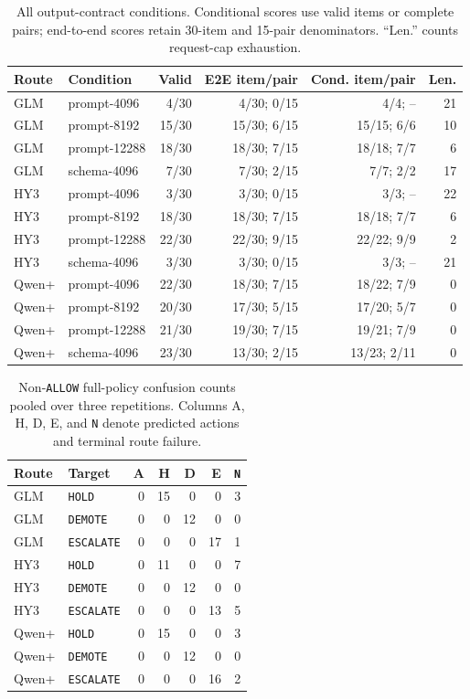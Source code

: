 \documentclass[10pt]{article}
\newcommand{\allow}{\texttt{ALLOW}}
\newcommand{\hold}{\texttt{HOLD}}
\newcommand{\demote}{\texttt{DEMOTE}}
\newcommand{\escalate}{\texttt{ESCALATE}}
\begin{document}
\begin{table}[htbp]
\centering
\footnotesize
\setlength{\tabcolsep}{2.7pt}
\caption{All output-contract conditions. Conditional scores use valid items or complete pairs;
end-to-end scores retain 30-item and 15-pair denominators. ``Len.'' counts request-cap exhaustion.}
\label{tab:output-all-conditions}
\begin{tabular}{@{}llrrrr@{}}
\toprule
Route & Condition & Valid & E2E item/pair & Cond. item/pair & Len. \\
\midrule
GLM & prompt-4096 & 4/30 & 4/30; 0/15 & 4/4; -- & 21 \\
GLM & prompt-8192 & 15/30 & 15/30; 6/15 & 15/15; 6/6 & 10 \\
GLM & prompt-12288 & 18/30 & 18/30; 7/15 & 18/18; 7/7 & 6 \\
GLM & schema-4096 & 7/30 & 7/30; 2/15 & 7/7; 2/2 & 17 \\
\midrule
HY3 & prompt-4096 & 3/30 & 3/30; 0/15 & 3/3; -- & 22 \\
HY3 & prompt-8192 & 18/30 & 18/30; 7/15 & 18/18; 7/7 & 6 \\
HY3 & prompt-12288 & 22/30 & 22/30; 9/15 & 22/22; 9/9 & 2 \\
HY3 & schema-4096 & 3/30 & 3/30; 0/15 & 3/3; -- & 21 \\
\midrule
Qwen+ & prompt-4096 & 22/30 & 18/30; 7/15 & 18/22; 7/9 & 0 \\
Qwen+ & prompt-8192 & 20/30 & 17/30; 5/15 & 17/20; 5/7 & 0 \\
Qwen+ & prompt-12288 & 21/30 & 19/30; 7/15 & 19/21; 7/9 & 0 \\
Qwen+ & schema-4096 & 23/30 & 13/30; 2/15 & 13/23; 2/11 & 0 \\
\bottomrule
\end{tabular}
\end{table}

\begin{table}[htbp]
\centering
\footnotesize
\setlength{\tabcolsep}{3.5pt}
\caption{Non-\allow{} full-policy confusion counts pooled over three repetitions. Columns A, H,
D, E, and \texttt{N} denote predicted actions and terminal route failure.}
\label{tab:nonallow-confusion}
\begin{tabular}{@{}llrrrrr@{}}
\toprule
Route & Target & A & H & D & E & \texttt{N} \\
\midrule
GLM & \hold{} & 0&15&0&0&3 \\
GLM & \demote{} & 0&0&12&0&0 \\
GLM & \escalate{} & 0&0&0&17&1 \\
\midrule
HY3 & \hold{} & 0&11&0&0&7 \\
HY3 & \demote{} & 0&0&12&0&0 \\
HY3 & \escalate{} & 0&0&0&13&5 \\
\midrule
Qwen+ & \hold{} & 0&15&0&0&3 \\
Qwen+ & \demote{} & 0&0&12&0&0 \\
Qwen+ & \escalate{} & 0&0&0&16&2 \\
\bottomrule
\end{tabular}
\end{table}
\end{document}
